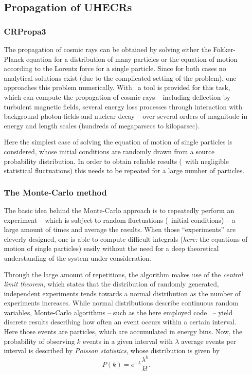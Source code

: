 \subsection{Propagation of UHECRs}
\subsubsection{CRPropa3}
The propagation of cosmic rays can be obtained by solving either the
Fokker-Planck equation for a distribution of many particles
or the equation of motion according to the Lorentz force for a single particle.
Since for both cases no analytical solutions exist (due to the complicated
setting of the problem), one approaches this problem
numerically. With \CRPropa~a tool is provided for this task, which can compute
the propagation of cosmic rays -- including deflection by turbulent magnetic
fields, several energy loss processes through interaction with background
photon fields and nuclear decay -- over several orders of magnitude in energy
and length scales (hundreds of megaparsecs to kiloparsec).

Here the simplest case of solving the equation of motion of single particles is
considered, whose initial conditions are randomly drawn from a source probability
distribution. In order to obtain reliable results (\ie~with negligible
statistical fluctuations) this needs to be repeated for a large number of
particles.


\subsubsection{The Monte-Carlo method}
The basic idea behind the Monte-Carlo approach is to repeatedly perform an
experiment -- which is subject to random fluctuations (\eg~initial
conditions) -- a large amount of times and average the results. When
those \enquote{experiments} are cleverly designed, one is able to compute
difficult integrals (\emph{here:} the equations of motion of single
particles) easily without the need for a deep theoretical understanding of
the system under consideration.

Through the large amount of repetitions, the algorithm makes use of the
\emph{central limit theorem}, which states that the distribution of randomly
generated, independent experiments tends towards a normal distribution as the
number of experiments increases.
While normal distributions describe continuous random variables, Monte-Carlo
algorithms -- such as the here employed code \CRPropa~-- yield discrete results
describing how often an event occurs within a certain interval. Here those
events are particles, which are accumulated in energy bins.
Now, the probability of observing $k$ events in a given interval with $\lambda$
average events per interval is described by \emph{Poisson statistics}, whose
distribution is given by
\begin{equation}
    P(k)=e^{-\lambda}\frac{\lambda^k}{k!}.
    \label{eq:poisson}
\end{equation}

